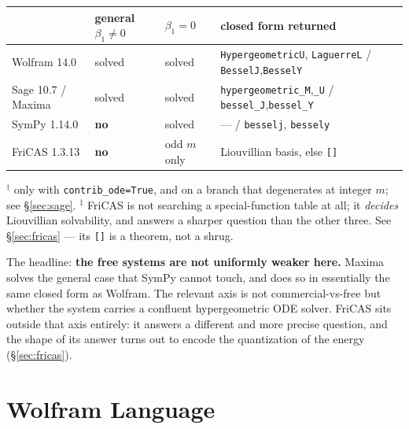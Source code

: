 \documentclass[11pt]{article}
\begin{document}
\begin{table}[h]
\centering
\small
\setlength{\tabcolsep}{4pt}
\begin{tabular}{@{}llll@{}}
\toprule
 & \textbf{general $\beta_1\neq0$} & \textbf{$\beta_1=0$} & \textbf{closed form returned}\\
\midrule
Wolfram 14.0        & solved & solved & \verb|HypergeometricU|, \verb|LaguerreL| / \verb|BesselJ|,\verb|BesselY| \\
Sage 10.7 / Maxima  & solved\rlap{$^\dagger$} & solved & \verb|hypergeometric_M|,\verb|_U| / \verb|bessel_J|,\verb|bessel_Y| \\
SymPy 1.14.0        & \textbf{no} & solved & --- / \verb|besselj|, \verb|bessely| \\
FriCAS 1.3.13       & \textbf{no}\rlap{$^\ddagger$} & odd $m$ only\rlap{$^\ddagger$} & Liouvillian basis, else \verb|[]| \\
\bottomrule
\end{tabular}
\end{table}

\noindent$^\dagger$ only with \verb|contrib_ode=True|, and on a branch that
degenerates at integer $m$; see \S\ref{sec:sage}.
$^\ddagger$ FriCAS is not searching a special-function table at all; it
\emph{decides} Liouvillian solvability, and answers a sharper question than
the other three.  See \S\ref{sec:fricas} --- its \verb|[]| is a theorem, not
a shrug.

The headline: \textbf{the free systems are not uniformly weaker here.}
Maxima solves the general case that SymPy cannot touch, and does so in
essentially the same closed form as Wolfram.  The relevant axis is not
commercial-vs-free but whether the system carries a confluent
hypergeometric ODE solver.  FriCAS sits outside that axis entirely: it
answers a different and more precise question, and the shape of its answer
turns out to encode the quantization of the energy (\S\ref{sec:fricas}).

\section{Wolfram Language}
\end{document}
